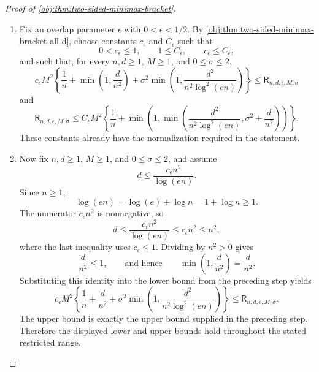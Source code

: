 \begin{proof}[Proof of \cref{obj:thm:two-sided-minimax-bracket}]
\begin{enumerate}
\item Fix an overlap parameter \(\epsilon\) with \(0<\epsilon<1/2\).  By \cref{obj:thm:two-sided-minimax-bracket-all-d}, choose constants \(c_{\epsilon}\) and \(C_{\epsilon}\) such that
\[
0<c_{\epsilon}\le 1,\qquad 1\le C_{\epsilon},\qquad c_{\epsilon}\le C_{\epsilon},
\]
and such that, for every \(n,d\ge1\), \(M\ge1\), and \(0\le\sigma\le2\),
\[
c_{\epsilon}M^2
\left\{
\frac1n+\min\left(1,\frac{d}{n^2}\right)
+\sigma^2\min\left(1,\frac{d^2}{n^2\log^2(en)}\right)
\right\}
\le
\mathsf R_{n,d,\epsilon,M,\sigma}
\]
and
\[
\mathsf R_{n,d,\epsilon,M,\sigma}
\le
C_{\epsilon}M^2
\left\{
\frac1n+
\min\left(1,\min\left(\frac{d^2}{n^2\log^2(en)},\sigma^2+\frac{d}{n^2}\right)\right)
\right\}.
\]
These constants already have the normalization required in the statement. %

\item Now fix \(n,d\ge1\), \(M\ge1\), and \(0\le\sigma\le2\), and assume
\[
d\le \frac{c_{\epsilon}n^2}{\log(en)} .
\]
Since \(n\ge1\),
\[
\log(en)=\log(e)+\log n=1+\log n\ge1.
\]
The numerator \(c_{\epsilon}n^2\) is nonnegative, so
\[
d\le \frac{c_{\epsilon}n^2}{\log(en)}
\le c_{\epsilon}n^2
\le n^2,
\]
where the last inequality uses \(c_{\epsilon}\le1\).  Dividing by \(n^2>0\) gives
\[
\frac{d}{n^2}\le1,
\qquad\text{and hence}\qquad
\min\left(1,\frac{d}{n^2}\right)=\frac{d}{n^2}.
\]
Substituting this identity into the lower bound from the preceding step yields
\[
c_{\epsilon}M^2\left\{
\frac{1}{n}+\frac{d}{n^2}
+\sigma^2\min\left(1,\frac{d^2}{n^2\log^2(en)}\right)
\right\}
\le
\mathsf R_{n,d,\epsilon,M,\sigma}.
\]
The upper bound is exactly the upper bound supplied in the preceding step.  Therefore the displayed lower and upper bounds hold throughout the stated restricted range. %
\end{enumerate}
\end{proof}
